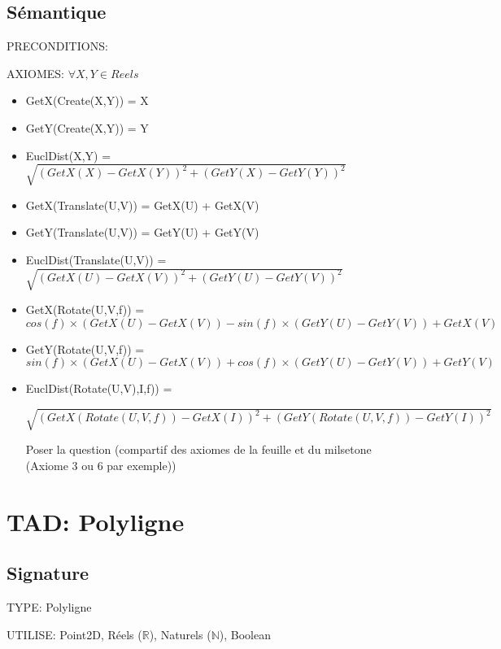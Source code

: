 \documentclass[a4paper, 11pt, oneside]{article}
\begin{document}
\subsection{Sémantique}
\noindent PRECONDITIONS:

\noindent AXIOMES: 
$\forall X,Y \in Reels$
\begin{itemize}
    \item GetX(Create(X,Y)) = X
    \item GetY(Create(X,Y)) = Y
    \item EuclDist(X,Y) = $\sqrt{{(GetX(X)-GetX(Y))}^{2}+{(GetY(X)-GetY(Y))}^{2}}$
    \item GetX(Translate(U,V)) = GetX(U) + GetX(V)
    \item GetY(Translate(U,V)) = GetY(U) + GetY(V)
    \item EuclDist(Translate(U,V)) = $\sqrt{{(GetX(U)-GetX(V))}^{2}+{(GetY(U)-GetY(V))}^{2}}$
    \item GetX(Rotate(U,V,f)) = $cos(f) \times (GetX(U)-GetX(V)) - sin(f) \times (GetY(U)-GetY(V)) + GetX(V) $ 
    \item GetY(Rotate(U,V,f)) = $sin(f) \times (GetX(U)-GetX(V)) + cos(f) \times (GetY(U)-GetY(V)) + GetY(V) $ 
    \item EuclDist(Rotate(U,V),I,f)) =
    
    $\sqrt{{(GetX(Rotate(U,V,f))-GetX(I))}^{2}+{(GetY(Rotate(U,V,f))-GetY(I))}^{2}}$
    
    {\color{red} Poser la question (compartif des axiomes de la feuille et du milsetone (Axiome 3 ou 6 par exemple))}
\end{itemize}


\section{TAD: Polyligne}

\subsection{Signature}

\noindent TYPE: Polyligne

\noindent UTILISE: Point2D, Réels ($\mathbb{R}$), Naturels ($\mathbb{N}$), Boolean
\end{document}
